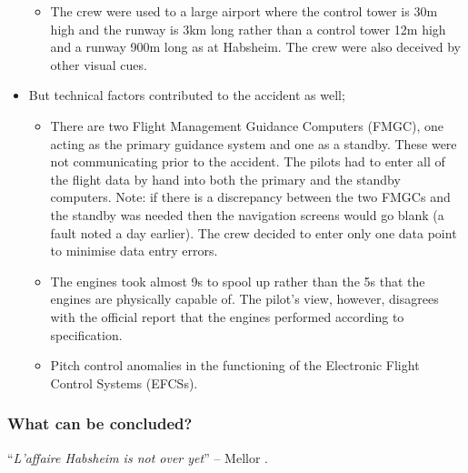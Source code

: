 \begin{itemize}
\begin{itemize}
  \item The crew were used to a large airport where the control tower is
  30m high and the runway is 3km long rather than a control tower 12m
  high and a runway 900m long as at Habsheim.  The crew were also
  deceived by other visual cues.

  \end{itemize}

  \item But technical factors contributed to the accident as well;

    \begin{itemize}

    \item There are two Flight Management Guidance Computers (FMGC), one acting as the primary guidance
      system and one as a standby.  These were not communicating prior
      to the accident.  The pilots had to enter all of the flight data
      by hand into both the primary and the standby computers.  Note:
      if there is a discrepancy between the two FMGCs and the standby
      was needed then the navigation screens would go blank (a fault
      noted a day earlier). The crew decided to enter only one data
      point to minimise data entry errors.

    \item The engines took almost 9s to spool up rather than the 5s
      that the engines are physically capable of.  The pilot's view,
      however, disagrees with the official report that the engines
      performed according to specification.

    \item Pitch control anomalies in the functioning of the Electronic Flight Control Systems (EFCSs).

    \end{itemize} 
\end{itemize}




  \subsubsection*{What can be concluded?}

  ``\emph{L'affaire Habsheim is not over yet}'' -- Mellor \cite{mellor1994cad}.


